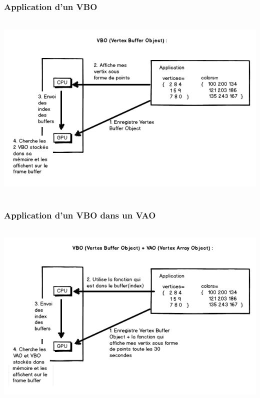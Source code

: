 \subsubsection{Application d'un VBO}
\includegraphics[width=15cm,height=9.26cm]{img/VBO.png}
\subsubsection{Application d'un VBO dans un VAO}
\includegraphics[width=15cm,height=9.21cm]{img/VAO_VBO.png}
